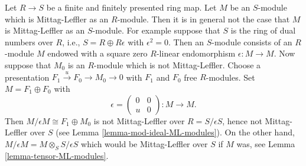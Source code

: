 \begin{remark}
\label{remark-go-up-ML-modules}
Let $R \to S$ be a finite and finitely presented ring map.
Let $M$ be an $S$-module which is Mittag-Leffler as an $R$-module.
Then it is in general not the case that $M$ is Mittag-Leffler as
an $S$-module. For example suppose that $S$ is the ring of dual numbers
over $R$, i.e., $S = R \oplus R\epsilon$ with $\epsilon^2 = 0$. Then an
$S$-module consists of an $R$-module $M$ endowed with a square zero
$R$-linear endomorphism $\epsilon : M \to M$. Now suppose that $M_0$
is an $R$-module which is not Mittag-Leffler. Choose a presentation
$F_1 \xrightarrow{u} F_0 \to M_0 \to 0$ with $F_1$ and $F_0$ free $R$-modules.
Set $M = F_1 \oplus F_0$ with
$$
\epsilon =
\left(
\begin{matrix}
0 & 0 \\
u & 0
\end{matrix}
\right) : M \longrightarrow M.
$$
Then $M/\epsilon M \cong F_1 \oplus M_0$ is not Mittag-Leffler over
$R = S/\epsilon S$, hence not Mittag-Leffler over $S$ (see
Lemma \ref{lemma-mod-ideal-ML-modules}).
On the other hand, $M/\epsilon M = M \otimes_S S/\epsilon S$ which would
be Mittag-Leffler over $S$ if $M$ was, see
Lemma \ref{lemma-tensor-ML-modules}.
\end{remark}


